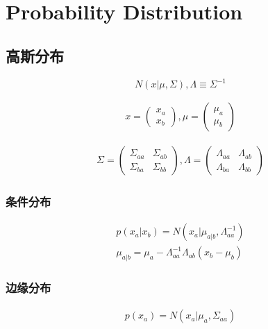 \chapter{Probability Distribution}

\section{高斯分布}
\begin{equation}
N(x|\mu, \Sigma), \Lambda \equiv \Sigma^{-1}
\end{equation}

\begin{equation}
\begin{aligned}
x = \begin{pmatrix}
 x_a\\ 
 x_b
  \end{pmatrix},
\mu = 
\begin{pmatrix}
 \mu_a \\ 
 \mu_b
  \end{pmatrix}
\end{aligned}
\end{equation}

\begin{equation}
\begin{aligned}
\Sigma = \begin{pmatrix}
\Sigma_{aa}&\Sigma_{ab}\\
\Sigma_{ba}&\Sigma_{bb}
\end{pmatrix},
\Lambda = 
\begin{pmatrix}
\Lambda_{aa}& \Lambda_{ab}\\
\Lambda_{ba}& \Lambda_{bb}
\end{pmatrix}
\end{aligned}
\end{equation}

\subsection{条件分布}
\begin{equation}
\begin{aligned}
p(x_a|x_b) = N(x_a|\mu_{a|b}, \Lambda_{aa}^{-1})
\\
\mu_{a|b} = \mu_a - \Lambda_{aa}^{-1}\Lambda_{ab}(x_b - \mu_b)
\end{aligned}
\end{equation}

\subsection{边缘分布}
\begin{equation}
\begin{aligned}
p(x_a) = N(x_a|\mu_a, \Sigma_{aa})
\end{aligned}
\end{equation}

